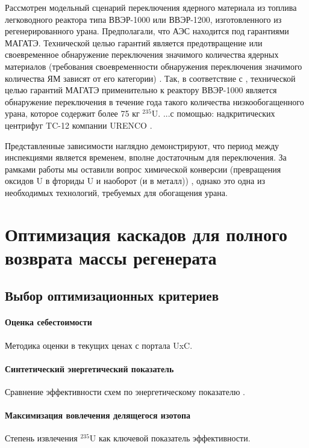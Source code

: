 Рассмотрен модельный сценарий переключения ядерного материала из топлива легководного реактора типа ВВЭР-1000 или ВВЭР-1200,  изготовленного из регенерированного урана. Предполагали, что АЭС находится под гарантиями МАГАТЭ. Технической целью гарантий является предотвращение или своевременное обнаружение переключения значимого количества ядерных материалов (требования своевременности обнаружения переключения значимого количества ЯМ зависят от  его категории) \cite{ermakovVozmozhnyeProceduryGarantiy1987}. Так, в соответствие с \cite{ermakovVozmozhnyeProceduryGarantiy1987}, технической целью гарантий МАГАТЭ применительно к реактору ВВЭР-1000 является обнаружение переключения в течение года такого количества низкообогащенного урана, которое содержит более 75 кг $^{235}$U.
...с помощью:  надкритических центрифуг TC-12 компании URENCO \cite{borisevichIdealOptimumCascades2014}. 


Представленные зависимости наглядно демонстрируют, что период между инспекциями является временем, вполне достаточным для переключения. За рамками работы мы оставили вопрос химической конверсии (превращения оксидов U в фториды U и наоборот (и в металл)) \cite{orlovDesublimationPurificationTransporting2017}, однако это одна из необходимых технологий, требуемых для обогащения урана. 


\section{Оптимизация каскадов для полного возврата массы регенерата}\label{sec:ch2/sec5}
\subsection{Выбор оптимизационных критериев}\label{sec:ch2/sec5.1}

\paragraph{Оценка себестоимости}
Методика оценки в текущих ценах с портала UxC.
\paragraph{Синтетический энергетический показатель}
Сравнение эффективности схем по энергетическому показателю \cite{2019}.
\paragraph{Максимизация вовлечения делящегося изотопа}
Степень извлечения $^{235}$U как ключевой показатель эффективности.

